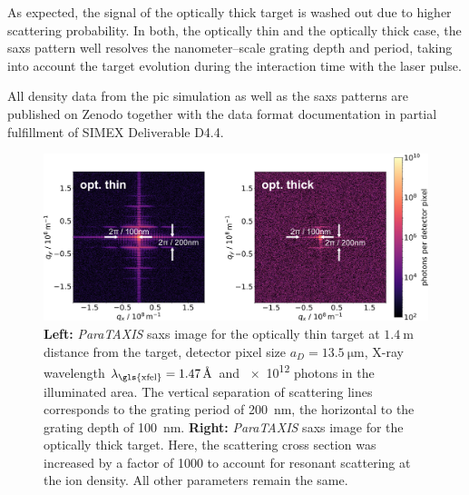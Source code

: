 As expected, the signal of the optically thick target is washed out due to
higher scattering probability. In both, the optically thin and the optically
thick case, the
\gls{saxs} pattern well resolves the nanometer--scale grating depth and period, taking
into account the target evolution during the interaction time with the laser
pulse.

All density data from the \gls{pic} simulation as well as the \gls{saxs} patterns are
published on Zenodo together with the data format documentation
\cite{Garten2017.zenodo.885033} in partial fulfillment of SIMEX Deliverable D4.4.

\begin{figure}
\centering
  \includegraphics[width=.99\linewidth]{figures/scattering_images_v2.png}
\caption{
\textbf{Left:} \textit{ParaTAXIS} \gls{saxs} image for the optically thin target at
$\SI{1.4}{\metre}$ distance from the target, detector pixel size $a_D =
\SI{13.5}{\micro\metre}$, X-ray wavelength $\lambda_\mathrm{\gls{xfel}} =
\SI{1.47}{\angstrom}$ and
\num{e12} photons in the illuminated area. The vertical separation of scattering
lines corresponds to the grating period of \SI{200}{\nano\metre}, the horizontal to
the grating depth of \SI{100}{\nano\metre}.
\textbf{Right:} \textit{ParaTAXIS} \gls{saxs} image for the optically thick target. Here, the
scattering cross section was increased by a factor of \num{1000} to account for
resonant scattering at the ion density. All other parameters remain the same.  }
  \label{fig:scattering}
\end{figure}



